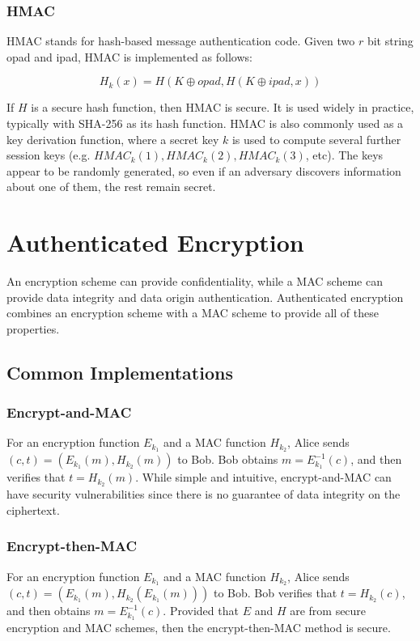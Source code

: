 \documentclass[12pt,titlepage]{article}
\let\stdsection\section
\renewcommand\section{\clearpage\stdsection}
\begin{document}
      \subsubsection{HMAC}
        HMAC stands for hash-based message authentication code. Given two $r$ bit string opad and ipad, HMAC is implemented as follows:

        $$H_k(x) = H(K \oplus opad, H(K \oplus ipad, x))$$

        If $H$ is a secure hash function, then HMAC is secure. It is used widely in practice, typically with SHA-256 as its hash function. HMAC is also commonly used as a key
        derivation function, where a secret key $k$ is used to compute several further session keys (e.g. $HMAC_k(1), HMAC_k(2), HMAC_k(3)$, etc). The keys appear to be randomly
        generated, so even if an adversary discovers information about one of them, the rest remain secret.

  \section{Authenticated Encryption}
    An encryption scheme can provide confidentiality, while a MAC scheme can provide data integrity and data origin authentication. Authenticated encryption combines an encryption
    scheme with a MAC scheme to provide all of these properties.

    \subsection{Common Implementations}
      \subsubsection{Encrypt-and-MAC}
        For an encryption function $E_{k_1}$ and a MAC function $H_{k_2}$, Alice sends $(c, t) = (E_{k_1}(m), H_{k_2}(m))$ to Bob. Bob obtains $m = E_{k_1}^{-1}(c)$, and then verifies
        that $t = H_{k_2}(m)$. While simple and intuitive, encrypt-and-MAC can have security vulnerabilities since there is no guarantee of data integrity on the ciphertext.

      \subsubsection{Encrypt-then-MAC}
        For an encryption function $E_{k_1}$ and a MAC function $H_{k_2}$, Alice sends $(c, t) = (E_{k_1}(m), H_{k_2}(E_{k_1}(m)))$ to Bob. Bob verifies that $t = H_{k_2}(c)$, and
        then obtains $m = E_{k_1}^{-1}(c)$. Provided that $E$ and $H$ are from secure encryption and MAC schemes, then the encrypt-then-MAC method is secure.
\end{document}
